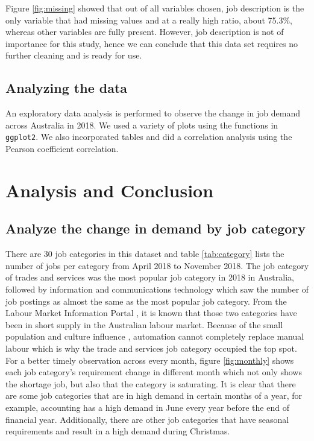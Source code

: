 \documentclass[11pt,a4paper,]{article}
\begin{document}
Figure \ref{fig:missing} showed that out of all variables chosen, job description is the only variable that had missing values and at a really high ratio, about 75.3\%, whereas other variables are fully present. However, job description is not of importance for this study, hence we can conclude that this data set requires no further cleaning and is ready for use.

\hypertarget{analyzing-the-data}{%
\subsection{Analyzing the data}\label{analyzing-the-data}}

An exploratory data analysis is performed to observe the change in job demand across Australia in 2018. We used a variety of plots using the functions in \texttt{ggplot2}. We also incorporated tables and did a correlation analysis using the Pearson coefficient correlation.

\hypertarget{analysis-and-conclusion}{%
\section{Analysis and Conclusion}\label{analysis-and-conclusion}}

\hypertarget{analyze-the-change-in-demand-by-job-category}{%
\subsection{Analyze the change in demand by job category}\label{analyze-the-change-in-demand-by-job-category}}

There are 30 job categories in this dataset and table \ref{tab:category} lists the number of jobs per category from April 2018 to November 2018. The job category of trades and services was the most popular job category in 2018 in Australia, followed by information and communications technology which saw the number of job postings as almost the same as the most popular job category. From the Labour Market Information Portal \autocite{welcome}, it is known that those two categories have been in short supply in the Australian labour market. Because of the small population and culture influence \autocite{burgess_2018}, automation cannot completely replace manual labour which is why the trade and services job category occupied the top spot.
For a better timely observation across every month, figure \ref{fig:monthly} shows each job category's requirement change in different month which not only shows the shortage job, but also that the category is saturating. It is clear that there are some job categories that are in high demand in certain months of a year, for example, accounting has a high demand in June every year before the end of financial year. Additionally, there are other job categories that have seasonal requirements and result in a high demand during Christmas.
\end{document}
